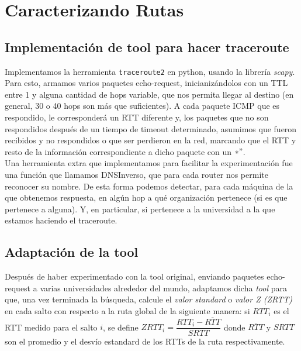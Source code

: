 \documentclass[final,inline,a4paper,narroweqnarray]{ieee}
\let\Oldsection\section
\renewcommand{\section}{\FloatBarrier\Oldsection}
\let\Oldsubsection\subsection
\renewcommand{\subsection}{\FloatBarrier\Oldsubsection}
\begin{document}
\section{Caracterizando Rutas}

  \subsection{Implementación de tool para hacer traceroute}
  Implementamos la herramienta \texttt{traceroute2} en python, usando la librería
  \emph{scapy}. Para esto, armamos varios paquetes echo-request, inicianizándolos con un TTL
  entre 1 y alguna cantidad de hops variable, que nos permita llegar al destino (en
  general, 30 o 40 hops son más que suficientes). A cada paquete ICMP que es respondido,
  le corresponderá un RTT diferente y, los paquetes que no son respondidos después de un tiempo
  de timeout determinado, asumimos que fueron recibidos y no respondidos o que ser perdieron en la red,
  marcando que el RTT y resto de la información correspondiente a dicho paquete con un $*"$. \\
  Una herramienta extra que implementamos para facilitar la experimentación
  fue una función que llamamos DNSInverso, que para cada router nos permite reconocer su nombre.
  De esta forma podemos detectar, para cada máquina de la que obtenemos respuesta, en algún hop
  a qué organización pertenece (si es que pertenece a alguna). Y, en particular,
  si pertenece a la universidad a la que estamos haciendo el traceroute.

  \subsection{Adaptación de la tool}
  Después de haber experimentado con la tool original, enviando paquetes
  echo-request a varias universidades alrededor del mundo, 
  adaptamos dicha \emph{tool} para que, una vez terminada 
  la búsqueda, calcule el \emph{valor standard}  o \emph{valor Z (ZRTT) } 
  en cada salto con respecto a la ruta global de la siguiente manera: si $RTT_i$ 
  es el RTT medido para el salto $i$, se define $ ZRTT_i = \dfrac{RTT_i 
  - \overline{RTT}}{SRTT} $ donde $\overline{RTT}$ y $SRTT$ son el promedio 
  y el desvío estandard de los RTTs de la ruta respectivamente.  
\end{document}
